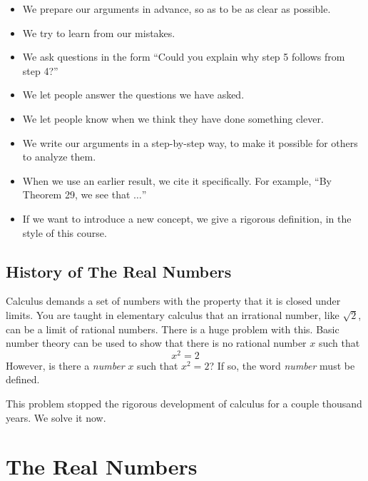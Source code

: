 \documentclass{article}
\begin{document}
\begin{itemize}

  \item We prepare our arguments in advance, so as to be as clear as possible.

  \item We try to learn from our mistakes.

  \item We ask questions in the form ``Could you explain why step 5 follows from step 4?''

  \item We let people answer the questions we have asked.

  \item We let people know when we think they have done something clever.

  \item We write our arguments in a step-by-step way, to make it possible for others to analyze them.

  \item When we use an earlier result, we cite it specifically. For example, ``By Theorem 29, we see that $\ldots$''

  \item If we want to introduce a new concept, we give a rigorous definition, in the style of this course.

\end{itemize}


\subsection{History of The Real Numbers}

Calculus demands a set of numbers with the property that it is closed under limits. You are taught in elementary calculus that an irrational number, like $\sqrt{2}$, can be a limit of rational numbers. There is a huge problem with this. Basic number theory can be used to show that there is no rational number $x$ such that
\begin{equation*}
x^{2}=2
\end{equation*}
However, is there a \emph{number} $x$ such that $x^{2}=2$? If so, the word \emph{number} must be defined.

This problem stopped the rigorous development of calculus for a couple thousand years. We solve it now.



\newpage

\section{The Real Numbers}
\end{document}
